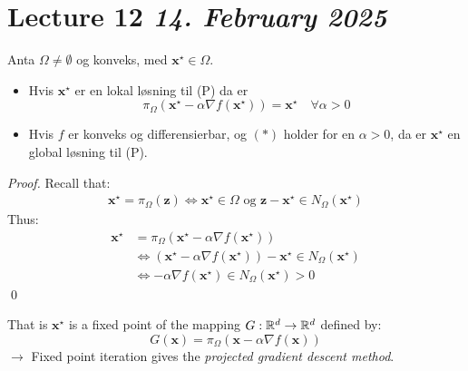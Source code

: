 \section{Lecture 12 \emph{14. February 2025}}

\begin{proposition}{}{}
  Anta \(\Omega \neq \emptyset\) og konveks, med \(\symbf{x}^\star \in \Omega\).
  \begin{itemize}
    \item Hvis \(\symbf{x}^\star\) er en lokal løsning til (P) da er
          \[
            \pi_{\Omega}(\symbf{x}^\star - \alpha \nabla f(\symbf{x}^\star)) = \symbf{x}^\star \quad \forall \alpha > 0 \tag{\(\ast\)}
          \]
    \item Hvis \(f\) er konveks og differensierbar, og \((\ast)\) holder for en \(\alpha > 0\), da er \(\symbf{x}^\star\) en global løsning til (P).
  \end{itemize}
\end{proposition}

\begin{proof}
  Recall that:
  \begin{align*}
    \symbf{x}^\star = \pi_{\Omega}(\symbf{z}) \iff \symbf{x}^\star \in \Omega \text{ og } \symbf{z} - \symbf{x}^\star \in N_{\Omega}(\symbf{x}^\star)
  \end{align*}
  Thus:
  \begin{align*}
    \symbf{x}^\star & = \pi_{\Omega}(\symbf{x}^\star - \alpha \nabla f(\symbf{x}^\star))                                                     \\
                    & \iff \left(\symbf{x}^\star - \alpha \nabla f(\symbf{x}^\star)\right) - \symbf{x}^\star \in N_{\Omega}(\symbf{x}^\star) \\
                    & \iff -\alpha \nabla f(\symbf{x}^\star) \in N_{\Omega}(\symbf{x}^\star) > 0
  \end{align*}
  \qed
\end{proof}

That is \(\symbf{x}^\star\) is a fixed point of the mapping \(G: \mathbb{R}^d \to \mathbb{R}^d\) defined by:
\[
  G(\symbf{x}) = \pi_{\Omega}(\symbf{x} - \alpha \nabla f(\symbf{x}))
\]
\( \rightarrow \) Fixed point iteration gives the \emph{projected gradient descent method}.


